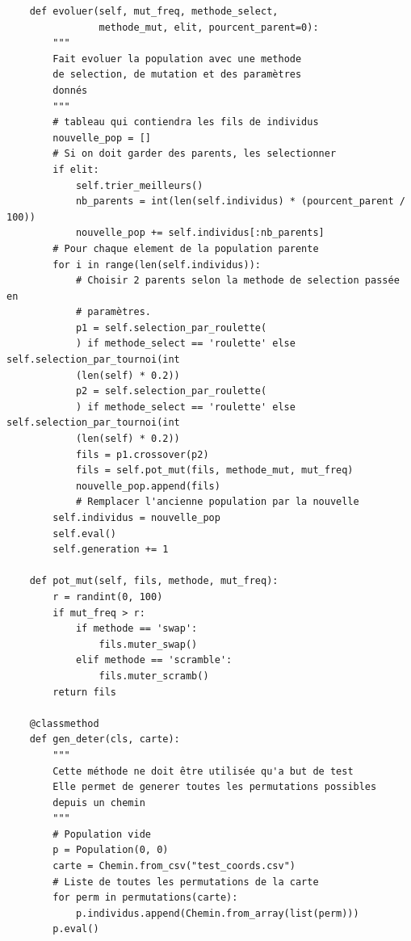 \documentclass[12pt]{article}
\begin{document}
\begin{verbatim}
    def evoluer(self, mut_freq, methode_select,
                methode_mut, elit, pourcent_parent=0):
        """
        Fait evoluer la population avec une methode
        de selection, de mutation et des paramètres
        donnés
        """
        # tableau qui contiendra les fils de individus
        nouvelle_pop = []
        # Si on doit garder des parents, les selectionner
        if elit:
            self.trier_meilleurs()
            nb_parents = int(len(self.individus) * (pourcent_parent / 100))
            nouvelle_pop += self.individus[:nb_parents]
        # Pour chaque element de la population parente
        for i in range(len(self.individus)):
            # Choisir 2 parents selon la methode de selection passée en
            # paramètres.
            p1 = self.selection_par_roulette(
            ) if methode_select == 'roulette' else self.selection_par_tournoi(int
            (len(self) * 0.2))
            p2 = self.selection_par_roulette(
            ) if methode_select == 'roulette' else self.selection_par_tournoi(int
            (len(self) * 0.2))
            fils = p1.crossover(p2)
            fils = self.pot_mut(fils, methode_mut, mut_freq)
            nouvelle_pop.append(fils)
            # Remplacer l'ancienne population par la nouvelle
        self.individus = nouvelle_pop
        self.eval()
        self.generation += 1

    def pot_mut(self, fils, methode, mut_freq):
        r = randint(0, 100)
        if mut_freq > r:
            if methode == 'swap':
                fils.muter_swap()
            elif methode == 'scramble':
                fils.muter_scramb()
        return fils

    @classmethod
    def gen_deter(cls, carte):
        """
        Cette méthode ne doit être utilisée qu'a but de test
        Elle permet de generer toutes les permutations possibles
        depuis un chemin
        """
        # Population vide
        p = Population(0, 0)
        carte = Chemin.from_csv("test_coords.csv")
        # Liste de toutes les permutations de la carte
        for perm in permutations(carte):
            p.individus.append(Chemin.from_array(list(perm)))
        p.eval()
 
\end{verbatim}
\end{document}
